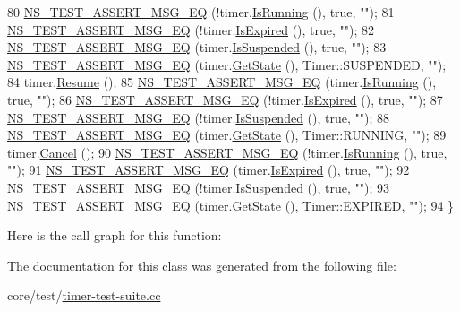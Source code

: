 \begin{DoxyCode}
80   \hyperlink{group__testing_ga2a9d78cffb3db8e867c35fff0b698cf5}{NS\_TEST\_ASSERT\_MSG\_EQ} (!timer.\hyperlink{classns3_1_1Timer_addbc6c740f21ddeb6ad358557962b24c}{IsRunning} (), \textcolor{keyword}{true}, \textcolor{stringliteral}{""});
81   \hyperlink{group__testing_ga2a9d78cffb3db8e867c35fff0b698cf5}{NS\_TEST\_ASSERT\_MSG\_EQ} (!timer.\hyperlink{classns3_1_1Timer_ab1de3f9236e67c0d83c061c19c607c6c}{IsExpired} (), \textcolor{keyword}{true}, \textcolor{stringliteral}{""});
82   \hyperlink{group__testing_ga2a9d78cffb3db8e867c35fff0b698cf5}{NS\_TEST\_ASSERT\_MSG\_EQ} (timer.\hyperlink{classns3_1_1Timer_a6eaea57766ec5e85023264fe2fb69066}{IsSuspended} (), \textcolor{keyword}{true}, \textcolor{stringliteral}{""});
83   \hyperlink{group__testing_ga2a9d78cffb3db8e867c35fff0b698cf5}{NS\_TEST\_ASSERT\_MSG\_EQ} (timer.\hyperlink{classns3_1_1Timer_ad8dbc96d811f55126b76de228d260eab}{GetState} (), Timer::SUSPENDED, \textcolor{stringliteral}{""});
84   timer.\hyperlink{classns3_1_1Timer_ac09edfb12f9b4ef8fe582f1cd210b6fc}{Resume} ();
85   \hyperlink{group__testing_ga2a9d78cffb3db8e867c35fff0b698cf5}{NS\_TEST\_ASSERT\_MSG\_EQ} (timer.\hyperlink{classns3_1_1Timer_addbc6c740f21ddeb6ad358557962b24c}{IsRunning} (), \textcolor{keyword}{true}, \textcolor{stringliteral}{""});
86   \hyperlink{group__testing_ga2a9d78cffb3db8e867c35fff0b698cf5}{NS\_TEST\_ASSERT\_MSG\_EQ} (!timer.\hyperlink{classns3_1_1Timer_ab1de3f9236e67c0d83c061c19c607c6c}{IsExpired} (), \textcolor{keyword}{true}, \textcolor{stringliteral}{""});
87   \hyperlink{group__testing_ga2a9d78cffb3db8e867c35fff0b698cf5}{NS\_TEST\_ASSERT\_MSG\_EQ} (!timer.\hyperlink{classns3_1_1Timer_a6eaea57766ec5e85023264fe2fb69066}{IsSuspended} (), \textcolor{keyword}{true}, \textcolor{stringliteral}{""});
88   \hyperlink{group__testing_ga2a9d78cffb3db8e867c35fff0b698cf5}{NS\_TEST\_ASSERT\_MSG\_EQ} (timer.\hyperlink{classns3_1_1Timer_ad8dbc96d811f55126b76de228d260eab}{GetState} (), Timer::RUNNING, \textcolor{stringliteral}{""});
89   timer.\hyperlink{classns3_1_1Timer_ac8261489cfc3361ab869ea2387cfc841}{Cancel} ();
90   \hyperlink{group__testing_ga2a9d78cffb3db8e867c35fff0b698cf5}{NS\_TEST\_ASSERT\_MSG\_EQ} (!timer.\hyperlink{classns3_1_1Timer_addbc6c740f21ddeb6ad358557962b24c}{IsRunning} (), \textcolor{keyword}{true}, \textcolor{stringliteral}{""});
91   \hyperlink{group__testing_ga2a9d78cffb3db8e867c35fff0b698cf5}{NS\_TEST\_ASSERT\_MSG\_EQ} (timer.\hyperlink{classns3_1_1Timer_ab1de3f9236e67c0d83c061c19c607c6c}{IsExpired} (), \textcolor{keyword}{true}, \textcolor{stringliteral}{""});
92   \hyperlink{group__testing_ga2a9d78cffb3db8e867c35fff0b698cf5}{NS\_TEST\_ASSERT\_MSG\_EQ} (!timer.\hyperlink{classns3_1_1Timer_a6eaea57766ec5e85023264fe2fb69066}{IsSuspended} (), \textcolor{keyword}{true}, \textcolor{stringliteral}{""});
93   \hyperlink{group__testing_ga2a9d78cffb3db8e867c35fff0b698cf5}{NS\_TEST\_ASSERT\_MSG\_EQ} (timer.\hyperlink{classns3_1_1Timer_ad8dbc96d811f55126b76de228d260eab}{GetState} (), Timer::EXPIRED, \textcolor{stringliteral}{""});
94 \}
\end{DoxyCode}


Here is the call graph for this function\+:




The documentation for this class was generated from the following file\+:\begin{DoxyCompactItemize}
\item 
core/test/\hyperlink{timer-test-suite_8cc}{timer-\/test-\/suite.\+cc}\end{DoxyCompactItemize}

